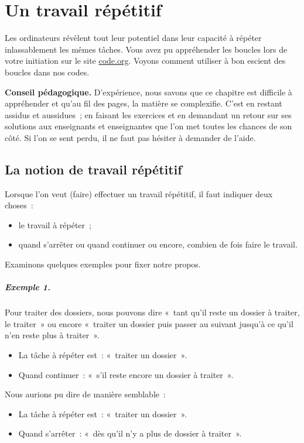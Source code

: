 \chapter{Un travail répétitif}
\label{chap:bcl}

	Les ordinateurs révèlent tout leur potentiel dans leur capacité à répéter
	inlassablement les mêmes tâches.  Vous avez pu appréhender les boucles lors
	de votre initiation sur le site \url{code.org}.  Voyons comment utiliser
	à bon escient des boucles dans nos codes.

	\textbf{Conseil pédagogique.} 
	D’expérience, nous savons que ce chapitre est difficile à appréhender et
	qu'au fil des pages, la matière se complexifie.  C'est en restant assidus et
	aussidues~; en faisant les exercices et en demandant un retour sur ses
	solutions aux enseignants et enseignantes que l'on met toutes les chances de
	son côté. Si l'on se sent perdu, il ne faut pas hésiter à demander de
	l'aide. 

	\minitoc

\section{La notion de travail répétitif}

	Lorsque l'on veut (faire) effectuer un travail répétitif, 
	il faut indiquer deux choses~:
	\begin{itemize}
	\item le travail à répéter~;
	\item quand s’arrêter ou quand continuer ou encore,  combien de fois faire 
		le travail.
	\end{itemize}

	Examinons quelques exemples pour fixer notre propos.

	\paragraph{Exemple 1.} 
	Pour traiter des dossiers, nous pouvons dire 
	«~tant qu’il reste un dossier à traiter, le traiter~» 
	ou encore 
	«~traiter un dossier puis passer au suivant jusqu’à ce qu’il n’en 
	reste plus à traiter~».
	\begin{itemize}
	\item La tâche à répéter est~: «~traiter un dossier~».
	\item Quand continuer~: «~s’il reste encore un dossier à traiter~».
	\end{itemize}
	Nous aurions pu dire de manière semblable~:
	\begin{itemize}
	\item La tâche à répéter est~: «~traiter un dossier~».
	\item Quand s'arrêter~: «~dès qu'il n'y a plus de dossier à traiter~».
	\end{itemize}

